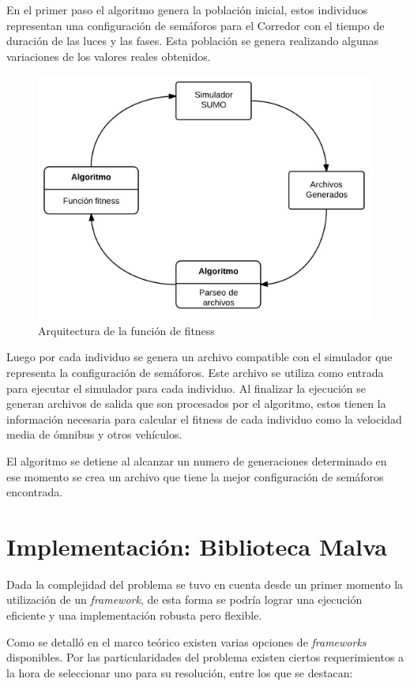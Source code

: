 En el primer paso el algoritmo genera la población inicial, estos individuos representan una configuración de semáforos para el Corredor con el tiempo de duración de las luces y las fases. Esta población se genera realizando algunas variaciones de los valores reales obtenidos.

\begin{figure}[H]
	\centering
	\includegraphics[width=0.7\linewidth]{Figures/arquitectura1}
	\caption{Arquitectura de la función de fitness}
	\label{fig:arquitectura1}
\end{figure}

Luego por cada individuo se genera un archivo compatible con el simulador que representa la configuración de semáforos. Este archivo se utiliza como entrada para ejecutar el simulador para cada individuo. Al finalizar la ejecución se generan archivos de salida que son procesados por el algoritmo, estos tienen la información necesaria para calcular el fitness de cada individuo como la velocidad media de ómnibus y otros vehículos.

El algoritmo se detiene al alcanzar un numero de generaciones determinado en ese momento se crea un archivo que tiene la mejor configuración de semáforos encontrada.




\section{Implementación: Biblioteca Malva}

Dada la complejidad del problema se tuvo en cuenta desde un primer momento la utilización de un \emph{framework}, de esta forma se podría lograr una ejecución eficiente y una implementación robusta pero flexible. 

Como se detalló en el marco teórico existen varias opciones de \emph{frameworks} disponibles. Por las particularidades del problema existen ciertos requerimientos a la hora de seleccionar  uno para su resolución, entre los que se destacan:

